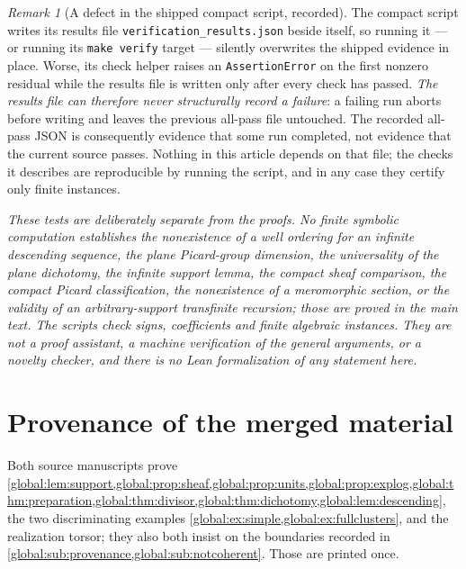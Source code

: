 \documentclass[11pt,letterpaper]{article}
\theoremstyle{definition}
\theoremstyle{remark}
\newtheorem{remark}[remark]{Remark}
\numberwithin{equation}{section}
\begin{document}
\begin{remark}[A defect in the shipped compact script, recorded]\label{global:rem:scriptdefect}
The compact script writes its results file \texttt{verification\_results.json} beside itself, so running it --- or running its \texttt{make verify} target --- silently overwrites the shipped evidence in place. Worse, its check helper raises an \texttt{AssertionError} on the first nonzero residual while the results file is written only after every check has passed. \emph{The results file can therefore never structurally record a failure}: a failing run aborts before writing and leaves the previous all-pass file untouched. The recorded all-pass JSON is consequently evidence that some run completed, not evidence that the current source passes. Nothing in this article depends on that file; the checks it describes are reproducible by running the script, and in any case they certify only finite instances.
\end{remark}

\emph{These tests are deliberately separate from the proofs. No finite symbolic computation establishes the nonexistence of a well ordering for an infinite descending sequence, the plane Picard-group dimension, the universality of the plane dichotomy, the infinite support lemma, the compact sheaf comparison, the compact Picard classification, the nonexistence of a meromorphic section, or the validity of an arbitrary-support transfinite recursion; those are proved in the main text. The scripts check signs, coefficients and finite algebraic instances. They are not a proof assistant, a machine verification of the general arguments, or a novelty checker, and there is no Lean formalization of any statement here.}

\section{Provenance of the merged material}\label{global:app:provenance}

Both source manuscripts prove \cref{global:lem:support,global:prop:sheaf,global:prop:units,global:prop:explog,global:thm:preparation,global:thm:divisor,global:thm:dichotomy,global:lem:descending}, the two discriminating examples \cref{global:ex:simple,global:ex:fullclusters}, and the realization torsor; they also both insist on the boundaries recorded in \cref{global:sub:provenance,global:sub:notcoherent}. Those are printed once.
\end{document}
